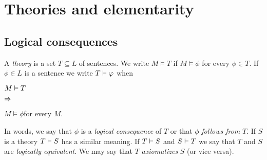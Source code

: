 \documentclass[creche.tex]{subfiles}
\begin{document}
\chapter{Theories and elementarity}
\label{teorie}

\def\medrel#1{\parbox[t]{6ex}{$\displaystyle\hfil #1$}}
\def\ceq#1#2#3{\parbox{15ex}{$\displaystyle #1$}\medrel{#2}$\displaystyle  #3$}

\section{Logical consequences}\label{conseguenzelogiche}
% 
% 
% 
% 
% 
% 


A \emph{theory\/} is a set $T\subseteq L$ of sentences. We write \emph{$M\models T$\/} if $M\models\phi$ for every $\phi\in T$. If $\phi\in L$ is a sentence we write \emph{$T\vdash\varphi$\/} when

\ceq{\hfill M\models T}{\IMP}{M\models\phi}\qquad for every $M$.

In words, we say that $\phi$ is a \emph{logical consequence\/} of $T$ or that $\phi$ \emph{follows from\/} $T$. If $S$ is a theory \emph{$T\vdash S$\/} has a similar meaning. If $T\vdash S$ and $S\vdash T$ we say that $T$ and $S$ are \emph{logically equivalent}.  We may say that $T$ \emph{axiomatizes\/} $S$ (or vice versa).
\end{document}
